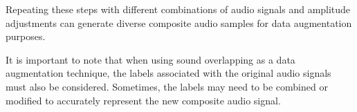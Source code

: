 Repeating these steps with different combinations of audio signals and amplitude adjustments can generate diverse composite audio samples for data augmentation purposes.

It is important to note that when using sound overlapping as a data augmentation technique, the labels associated with the original audio signals must also be considered. Sometimes, the labels may need to be combined or modified to accurately represent the new composite audio signal.
